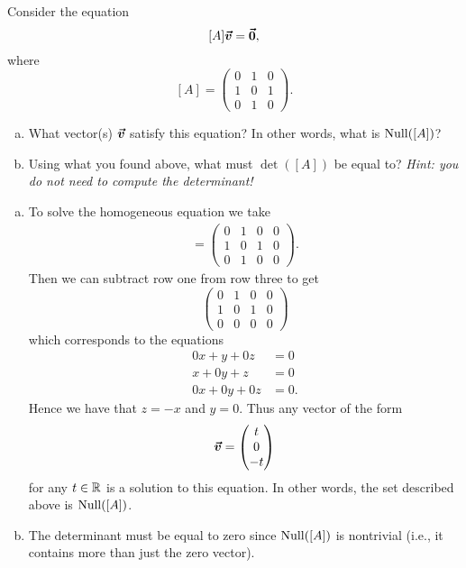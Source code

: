\documentclass[12pt]{article} %
\begin{document}
\newpage
\begin{problem}
Consider the equation
\[
[A]\boldsymbol{\vec{v}} = \boldsymbol{\vec{0}},
\]
where
\[
[A] = \begin{pmatrix} 0 & 1 & 0 \\ 1 & 0 & 1 \\ 0 & 1 & 0 \end{pmatrix}.
\]
\begin{enumerate}[(a)]
    \item What vector(s) $\boldsymbol{\vec{v}}$ satisfy this equation? In other words, what is $\mathrm{Null}([A])$?
    \item Using what you found above, what must $\det([A])$ be equal to? \emph{Hint: you do not need to compute the determinant!}
\end{enumerate}
\end{problem}
\begin{solution}
\begin{enumerate}[(a)]
    \item To solve the homogeneous equation we take
    \begin{align*}
        [M]=\left(\begin{array}{ccc|c}
            0 & 1 & 0 &0 \\
            1 & 0 & 1 &0\\
            0 & 1 & 0 &0
        \end{array}\right).
    \end{align*}
    Then we can subtract row one from row three to get
    \[
    \left(\begin{array}{ccc|c}
            0 & 1 & 0 &0\\
            1 & 0 & 1 &0\\
            0 & 0 & 0 &0
        \end{array}\right)
    \]
    which corresponds to the equations
    \begin{align*}
        0x+y+0z&=0\\
        x+0y+z&=0\\
        0x+0y+0z&=0.
    \end{align*}
    Hence we have that $z=-x$ and $y=0$.  Thus any vector of the form
    \[
    \boldsymbol{\vec{v}} = \begin{pmatrix} t \\ 0 \\ -t \end{pmatrix}
    \]
    for any $t\in \mathbb{R}$ is a solution to this equation. In other words, the set described above is $\mathrm{Null}([A])$.
    \item The determinant must be equal to zero since $\mathrm{Null}([A])$ is nontrivial (i.e., it contains more than just the zero vector).
\end{enumerate}
\end{solution}
\end{document}
